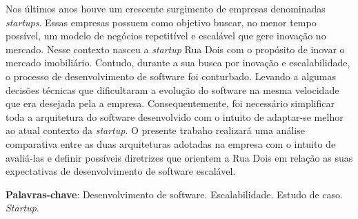 \begin{resumo}
    Nos últimos anos houve um crescente surgimento de empresas denominadas
    \textit{startups}. Essas empresas possuem como objetivo buscar, no menor
    tempo possível, um modelo de negócios repetitível e escalável que gere
    inovação no mercado. Nesse contexto nasceu a \textit{startup} Rua Dois
    com o propósito de inovar o mercado imobiliário. Contudo, durante
    a sua busca por inovação e escalabilidade, o processo de desenvolvimento
    de software foi conturbado. Levando a algumas decisões técnicas que
    dificultaram a evolução do software na mesma velocidade que era desejada
    pela a empresa. Consequentemente, foi necessário simplificar toda a arquitetura
    do software desenvolvido com o intuito de adaptar-se melhor ao atual contexto
    da \textit{startup}. O presente trabaho realizará uma análise comparativa
    entre as duas arquiteturas adotadas na empresa com o intuito de avaliá-las
    e definir possíveis diretrizes que orientem a Rua Dois em relação as suas
    expectativas de desenvolvimento de software escalável.
 \vspace{\onelineskip}
    
 \noindent
  \textbf{Palavras-chave}: Desenvolvimento de software. Escalabilidade.
    Estudo de caso. \textit{Startup}.
\end{resumo}
